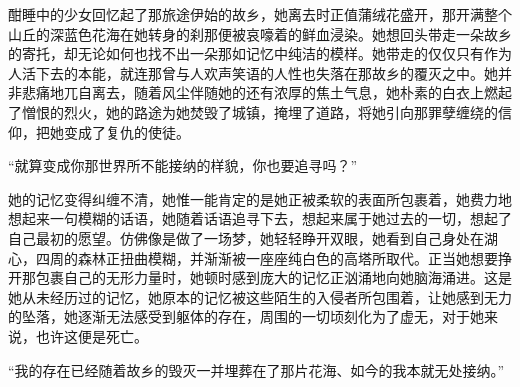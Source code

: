 
酣睡中的少女回忆起了那旅途伊始的故乡，她离去时正值蒲绒花盛开，那开满整个山丘的深蓝色花海在她转身的刹那便被哀嚎着的鲜血浸染。她想回头带走一朵故乡的寄托，却无论如何也找不出一朵那如记忆中纯洁的模样。她带走的仅仅只有作为人活下去的本能，就连那曾与人欢声笑语的人性也失落在那故乡的覆灭之中。她并非悲痛地兀自离去，随着风尘伴随她的还有浓厚的焦土气息，她朴素的白衣上燃起了憎恨的烈火，她的路途为她焚毁了城镇，掩埋了道路，将她引向那罪孽缠绕的信仰，把她变成了复仇的使徒。

“就算变成你那世界所不能接纳的样貌，你也要追寻吗？”

她的记忆变得纠缠不清，她惟一能肯定的是她正被柔软的表面所包裹着，她费力地想起来一句模糊的话语，她随着话语追寻下去，想起来属于她过去的一切，想起了自己最初的愿望。仿佛像是做了一场梦，她轻轻睁开双眼，她看到自己身处在湖心，四周的森林正扭曲模糊，并渐渐被一座座纯白色的高塔所取代。正当她想要挣开那包裹自己的无形力量时，她顿时感到庞大的记忆正汹涌地向她脑海涌进。这是她从未经历过的记忆，她原本的记忆被这些陌生的入侵者所包围着，让她感到无力的坠落，她逐渐无法感受到躯体的存在，周围的一切顷刻化为了虚无，对于她来说，也许这便是死亡。

“我的存在已经随着故乡的毁灭一并埋葬在了那片花海、如今的我本就无处接纳。”